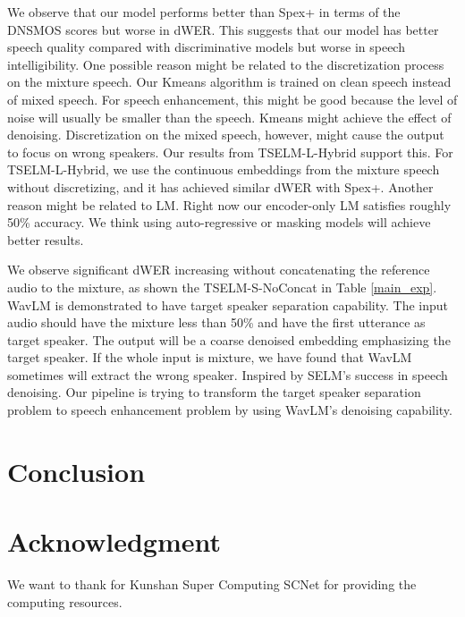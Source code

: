 \documentclass[conference]{IEEEtran}
\begin{document}
We observe that our model performs better than Spex+ in terms of the DNSMOS scores but worse in dWER. 
This suggests that our model has better speech quality compared with discriminative models but 
worse in speech intelligibility. One possible reason might be related 
to the discretization process on the mixture 
speech. Our Kmeans algorithm is trained on clean speech instead of mixed speech. 
For speech enhancement, this might be 
good because the level of noise will usually be smaller than the speech. Kmeans might achieve the 
effect of denoising. Discretization on the mixed
speech, however, might cause the output to focus on wrong speakers. 
Our results from TSELM-L-Hybrid 
support 
this. For TSELM-L-Hybrid, we use the continuous embeddings from the mixture speech without discretizing, and it has 
achieved similar dWER with Spex+. Another reason might be related to LM. Right now our encoder-only 
LM satisfies roughly 50\% accuracy. We think using auto-regressive or masking models will achieve 
better results. 

We observe significant dWER increasing without concatenating the reference audio to the mixture, 
as shown 
the TSELM-S-NoConcat in Table \ref{main_exp}. WavLM \cite{wavlm} is demonstrated to have target speaker 
separation capability. The input audio should have the mixture less than 50\% and have the first utterance as target speaker. The output will be a coarse denoised embedding emphasizing the target speaker. 
If the whole input is mixture, we have found that WavLM sometimes will 
extract the wrong speaker. Inspired by SELM's \cite{selm} success in speech denoising. Our pipeline is trying to transform
the target speaker separation problem to speech enhancement problem by using WavLM's denoising capability.

\section{Conclusion}









\section*{Acknowledgment}

We want to thank for Kunshan Super Computing SCNet for providing the computing resources. 



\end{document}
